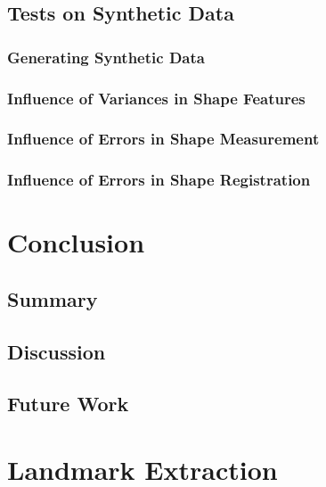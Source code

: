 \documentclass[pdftex,12pt,a4paper]{report}
\begin{document}
\section{Tests on Synthetic Data}

\subsection{Generating Synthetic Data}

\subsection{Influence of Variances in Shape Features}

\subsection{Influence of Errors in Shape Measurement}

\subsection{Influence of Errors in Shape Registration}

\chapter{Conclusion}

\section{Summary}

\section{Discussion}

\section{Future Work}

\appendix

\chapter{Landmark Extraction}
\end{document}
